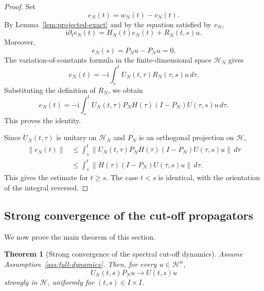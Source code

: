 \documentclass[11pt]{amsart}
\theoremstyle{plain}
\newtheorem{theorem}{Theorem}[section]
\theoremstyle{definition}
\theoremstyle{remark}
\newcommand{\Hilb}{\mathcal H}
\newcommand{\ii}{\mathrm i}
\begin{document}
\begin{proof}
Set
\[
        e_N(t)=w_N(t)-v_N(t).
\]
By Lemma~\ref{lem:projected-exact} and by the equation satisfied by
\(v_N\),
\[
        \ii\partial_t e_N(t)
        =
        H_N(t)e_N(t)+R_N(t,s)u.
\]
Moreover,
\[
        e_N(s)=P_Nu-P_Nu=0.
\]
The variation-of-constants formula in the finite-dimensional space
\(\Hilb_N\) gives
\[
        e_N(t)
        =
        -\ii
        \int_s^t
        U_N(t,\tau)R_N(\tau,s)u
        \,d\tau .
\]
Substituting the definition of \(R_N\), we obtain
\[
        e_N(t)
        =
        -\ii
        \int_s^t
        U_N(t,\tau)
        P_NH(\tau)(I-P_N)U(\tau,s)u
        \,d\tau.
\]
This proves the identity.

Since \(U_N(t,\tau)\) is unitary on \(\Hilb_N\) and \(P_N\) is an
orthogonal projection on \(\Hilb\),
\[
\begin{aligned}
        \|e_N(t)\|
        &\leq
        \int_s^t
        \|U_N(t,\tau)
        P_NH(\tau)(I-P_N)U(\tau,s)u\|
        \,d\tau                                    \\
        &\leq
        \int_s^t
        \|H(\tau)(I-P_N)U(\tau,s)u\|
        \,d\tau .
\end{aligned}
\]
This gives the estimate for \(t\geq s\).  The case \(t<s\) is identical,
with the orientation of the integral reversed.
\end{proof}

\subsection{Strong convergence of the cut-off propagators}

We now prove the main theorem of this section.

\begin{theorem}[Strong convergence of the spectral cut-off dynamics]
\label{thm:strong-cutoff-convergence}
Assume Assumption~\ref{ass:full-dynamics}.  Then, for every
\(u\in\Hilb^\mu\),
\[
        U_N(t,s)P_Nu
        \longrightarrow
        U(t,s)u
\]
strongly in \(\Hilb\), uniformly for \((t,s)\in I\times I\).
\end{theorem}
\end{document}
